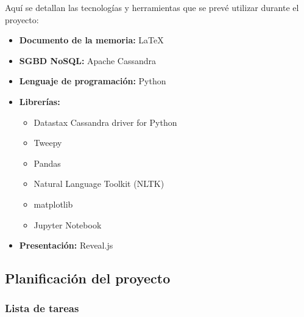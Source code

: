 Aquí se detallan las tecnologías y herramientas que se prevé
utilizar durante el proyecto:

\begin{itemize}
    \item \textbf{Documento de la memoria: } \LaTeX
    \item \textbf{SGBD NoSQL: } Apache Cassandra
    \item \textbf{Lenguaje de programación: } Python 
      \vspace{0.5cm}
    \item \textbf{Librerías: } 
      \begin{itemize}
      \item Datastax Cassandra driver for Python
      \item Tweepy
      \item Pandas
      \item Natural Language Toolkit (NLTK)
      \item matplotlib
      \item Jupyter Notebook
      \end{itemize}
    \item \textbf{Presentación: } Reveal.js
\end{itemize}

\subsection{Planificación del proyecto}
\label{subsec:planificació}


\subsubsection{Lista de tareas}
\label{subsubsec:tasklist}

